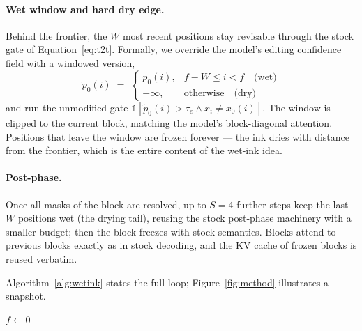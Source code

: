 \paragraph{Wet window and hard dry edge.}
Behind the frontier, the $W$ most recent positions stay revisable through the
stock gate of Equation~\eqref{eq:t2t}. Formally, we override the model's editing
confidence field with a windowed version,
\begin{equation}\label{eq:window}
\tilde{p}_0(i) \;=\;
\begin{cases}
p_0(i), & f - W \leq i < f \quad \text{(wet)}\\[2pt]
-\infty, & \text{otherwise} \quad \text{(dry)}
\end{cases}
\end{equation}
and run the unmodified gate $\mathbb{1}[\tilde{p}_0(i) > \tau_e \wedge x_i \neq
x_0(i)]$. The window is clipped to the current block, matching the model's
block-diagonal attention. Positions that leave the window are frozen forever ---
the ink dries with distance from the frontier, which is the entire content of the
wet-ink idea.

\paragraph{Post-phase.}
Once all masks of the block are resolved, up to $S{=}4$ further steps keep the
last $W$ positions wet (the drying tail), reusing the stock post-phase machinery
with a smaller budget; then the block freezes with stock semantics. Blocks attend
to previous blocks exactly as in stock decoding, and the KV cache of frozen blocks
is reused verbatim.

Algorithm~\ref{alg:wetink} states the full loop; Figure~\ref{fig:method}
illustrates a snapshot.

\begin{algorithm}[t]
\SetAlFnt{\small}
\caption{Wet-ink decoding of one block ($B$ positions, window $W$)}\label{alg:wetink}
$f \gets 0$ 
\While{$f < B$}{
  forward pass (stock block-diagonal attention)\;
  commit $x_f \gets x_0(f)$ greedily;\; $f \gets f+1$ \tcp*{one token per step}
  \ForEach(\tcp*[f]{wet window, verbatim T2T gate}){$i \in [\max(f{-}W,0),\, f)$}{
    \If{$p_0(i) > \tau_e$ \textbf{ and } $x_i \neq x_0(i)$}{
      $x_i \gets x_0(i)$ \tcp*{rewrite while wet}
    }
  }
  apply trained \texttt{SPLIT}/\texttt{DELETE} ops and anti-loop resampler
  (stock code)\;
}
 
\end{algorithm}

